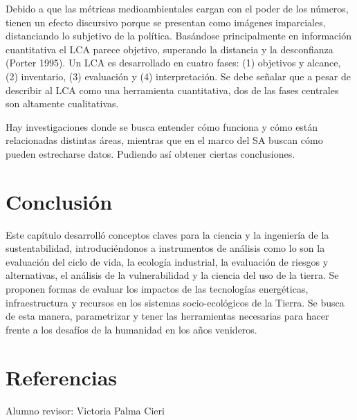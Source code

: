 \documentclass[runningheads]{llncs}
\begin{document}
\bigskip
Debido a que las métricas medioambientales cargan con el poder de los números, tienen un efecto discursivo porque se presentan como imágenes imparciales, distanciando lo subjetivo de la política. Basándose principalmente en información cuantitativa el LCA parece objetivo, superando la distancia y la desconfianza (Porter 1995). 
Un LCA es desarrollado en cuatro fases: (1) objetivos y alcance, (2) inventario, (3) evaluación y (4) interpretación. Se debe señalar que a pesar de describir al LCA como una herramienta cuantitativa, dos de las fases centrales son altamente cualitativas.

\bigskip
Hay investigaciones donde se busca entender cómo funciona y cómo están relacionadas distintas áreas, mientras que en el marco del SA buscan cómo pueden estrecharse datos. Pudiendo así obtener ciertas conclusiones.






\section*{Conclusión}
Este capítulo desarrolló conceptos claves para  la ciencia y la ingeniería de la sustentabilidad, introduciéndonos a instrumentos de análisis como lo son la evaluación del ciclo de vida, la ecología industrial, la evaluación de riesgos y alternativas, el análisis de la vulnerabilidad y la ciencia del uso de la tierra. Se proponen formas de evaluar los impactos de las tecnologías energéticas, infraestructura y recursos en los sistemas socio-ecológicos de la Tierra. Se busca de esta manera, parametrizar y tener las herramientas necesarias para hacer frente a los desafíos de la humanidad en los años venideros.

\section*{Referencias}
Alumno revisor: Victoria Palma Cieri
\end{document}
